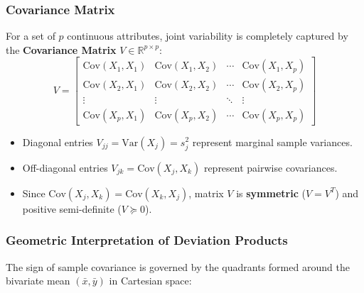 \subsubsection{Covariance Matrix}
For a set of $p$ continuous attributes, joint variability is completely captured by the \textbf{Covariance Matrix} $V \in \mathbb{R}^{p \times p}$:
\begin{equation}
    V = \begin{bmatrix}
        \text{Cov}(X_1, X_1) & \text{Cov}(X_1, X_2) & \cdots & \text{Cov}(X_1, X_p) \\
        \text{Cov}(X_2, X_1) & \text{Cov}(X_2, X_2) & \cdots & \text{Cov}(X_2, X_p) \\
        \vdots & \vdots & \ddots & \vdots \\
        \text{Cov}(X_p, X_1) & \text{Cov}(X_p, X_2) & \cdots & \text{Cov}(X_p, X_p)
    \end{bmatrix}
\end{equation}
\begin{itemize}[noitemsep]
    \item Diagonal entries $V_{jj} = \text{Var}(X_j) = s_j^2$ represent marginal sample variances.
    \item Off-diagonal entries $V_{jk} = \text{Cov}(X_j, X_k)$ represent pairwise covariances.
    \item Since $\text{Cov}(X_j, X_k) = \text{Cov}(X_k, X_j)$, matrix $V$ is \textbf{symmetric} ($V = V^T$) and positive semi-definite ($V \succeq 0$).
\end{itemize}

\subsubsection{Geometric Interpretation of Deviation Products}
The sign of sample covariance is governed by the quadrants formed around the bivariate mean $(\bar{x}, \bar{y})$ in Cartesian space:

